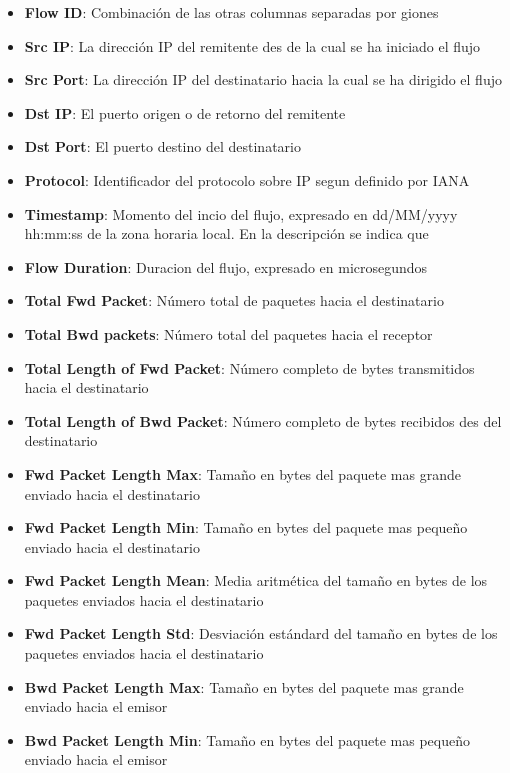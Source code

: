 \begin{itemize}
    \item \textbf{Flow ID}: Combinación de las otras columnas separadas por giones
    \item \textbf{Src IP}: La dirección IP del remitente des de la cual se ha iniciado el flujo
    \item \textbf{Src Port}: La dirección IP del destinatario hacia la cual se ha dirigido el flujo
    \item \textbf{Dst IP}: El puerto origen o de retorno del remitente
    \item \textbf{Dst Port}: El puerto destino del destinatario
    \item \textbf{Protocol}: Identificador del protocolo sobre IP segun definido por IANA \cite{ipprotocolnumbers}
    \item \textbf{Timestamp}: Momento del incio del flujo, expresado en dd/MM/yyyy hh:mm:ss de la zona horaria local. En la descripción se indica que 
    \item \textbf{Flow Duration}: Duracion del flujo, expresado en microsegundos
    \item \textbf{Total Fwd Packet}: Número total de paquetes hacia el destinatario
    \item \textbf{Total Bwd packets}: Número total del paquetes hacia el receptor
    \item \textbf{Total Length of Fwd Packet}: Número completo de bytes transmitidos hacia el destinatario
    \item \textbf{Total Length of Bwd Packet}: Número completo de bytes recibidos des del destinatario
    \item \textbf{Fwd Packet Length Max}: Tamaño en bytes del paquete mas grande enviado hacia el destinatario
    \item \textbf{Fwd Packet Length Min}: Tamaño en bytes del paquete mas pequeño enviado hacia el destinatario
    \item \textbf{Fwd Packet Length Mean}: Media aritmética del tamaño en bytes de los paquetes enviados hacia el destinatario
    \item \textbf{Fwd Packet Length Std}: Desviación estándard del tamaño en bytes de los paquetes enviados hacia el destinatario
    \item \textbf{Bwd Packet Length Max}: Tamaño en bytes del paquete mas grande enviado hacia el emisor
    \item \textbf{Bwd Packet Length Min}: Tamaño en bytes del paquete mas pequeño enviado hacia el emisor

\end{itemize}
